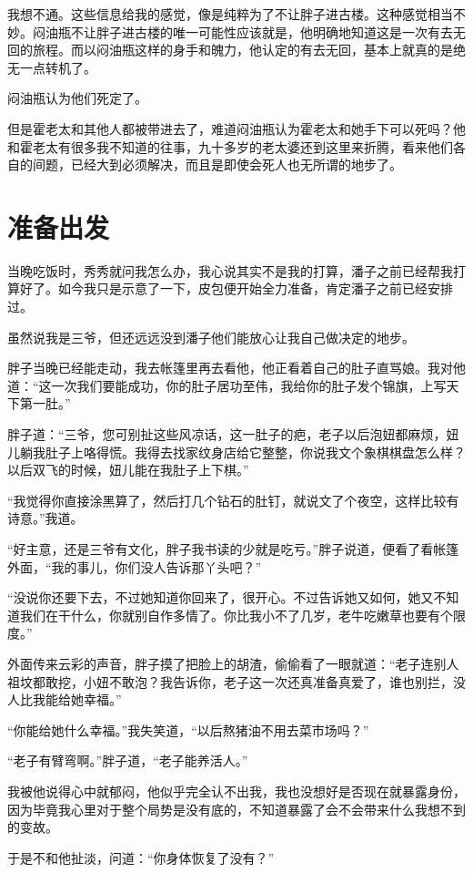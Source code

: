 我想不通。这些信息给我的感觉，像是纯粹为了不让胖子进古楼。这种感觉相当不妙。闷油瓶不让胖子进古楼的唯一可能性应该就是，他明确地知道这是一次有去无回的旅程。而以闷油瓶这样的身手和魄力，他认定的有去无回，基本上就真的是绝无一点转机了。

闷油瓶认为他们死定了。

但是霍老太和其他人都被带进去了，难道闷油瓶认为霍老太和她手下可以死吗？他和霍老太有很多我不知道的往事，九十多岁的老太婆还到这里来折腾，看来他们各自的间题，已经大到必须解决，而且是即使会死人也无所谓的地步了。

\chapter{准备出发}

当晚吃饭时，秀秀就问我怎么办，我心说其实不是我的打算，潘子之前已经帮我打算好了。如今我只是示意了一下，皮包便开始全力准备，肯定潘子之前已经安排过。

虽然说我是三爷，但还远远没到潘子他们能放心让我自己做决定的地步。

胖子当晚已经能走动，我去帐篷里再去看他，他正看着自己的肚子直骂娘。我对他道：“这一次我们要能成功，你的肚子居功至伟，我给你的肚子发个锦旗，上写天下第一肚。”

胖子道：“三爷，您可别扯这些风凉话，这一肚子的疤，老子以后泡妞都麻烦，妞儿躺我肚子上咯得慌。我得去找家纹身店给它整整，你说我文个象棋棋盘怎么样？以后双飞的时候，妞儿能在我肚子上下棋。”

“我觉得你直接涂黑算了，然后打几个钻石的肚钉，就说文了个夜空，这样比较有诗意。”我道。

“好主意，还是三爷有文化，胖子我书读的少就是吃亏。”胖子说道，便看了看帐篷外面，“我的事儿，你们没人告诉那丫头吧？”

“没说你还要下去，不过她知道你回来了，很开心。不过告诉她又如何，她又不知道我们在干什么，你就别自作多情了。你比我小不了几岁，老牛吃嫩草也要有个限度。”

外面传来云彩的声音，胖子摸了把脸上的胡渣，偷偷看了一眼就道：“老子连别人祖坟都敢挖，小妞不敢泡？我告诉你，老子这一次还真准备真爱了，谁也别拦，没人比我能给她幸福。”

“你能给她什么幸福。”我失笑道，“以后熬猪油不用去菜市场吗？”

“老子有臂弯啊。”胖子道，“老子能养活人。”

我被他说得心中就郁闷，他似乎完全认不出我，我也没想好是否现在就暴露身份，因为毕竟我心里对于整个局势是没有底的，不知道暴露了会不会带来什么我想不到的变故。

于是不和他扯淡，问道：“你身体恢复了没有？”

